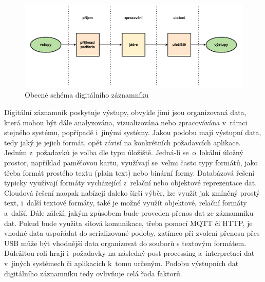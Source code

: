 \begin{figure}[h]
    \centering
    \includegraphics[width=1.00\textwidth]{obrazky-figures/common_digital_datalogger_scheme.pdf}
    \caption{Obecné schéma digitálního záznamníku}
    \label{fig:common-digital-datalogger}
\end{figure}




Digitální záznamník poskytuje výstupy, obvykle jimi jsou organizovaná data, která mohou být dále analyzována, vizualizována nebo zpracovávána v~rámci stejného systému, popřípadě i~jinými systémy. Jakou podobu mají výstupní data, tedy jaký je jejich formát, opět závisí na konkrétních požadavcích aplikace. Jedním z~požadavků je volba dle typu úložiště. Jedná-li se~o~lokální úložný prostor, například paměťovou kartu, využívají se~velmi často typy formátů, jako třeba formát prostého textu (plain text) nebo binární formy. Databázová řešení typicky využívají formáty vycházející z~relační nebo objektové reprezentace dat. Cloudová řešení naopak nabízejí daleko širší výběr, lze využít jak zmíněný prostý text, i~další textové formáty, také je možné využít objektové, relační formáty a~další. Dále záleží, jakým způsobem bude proveden přenos dat ze záznamníku dat. Pokud bude využita síťová komunikace, třeba pomocí MQTT či HTTP, je vhodné data uspořádat do serializované podoby, zatímco při zvolení přenosu přes USB může být vhodnější data organizovat do souborů s textovým formátem. Důležitou roli hrají i~požadavky na následný post-processing a~interpretaci dat v~jiných systémech či aplikacích k~tomu určeným. Podobu výstupních dat digitálního záznamníku tedy ovlivňuje celá řada faktorů.~\cite{usb_standard_mtp, iot_datalogger_with_timestamping, springer_industry_monitoring, researchgate_general_dataloggger_multiple_sdcards, medium_optimalization_iot_data_storage_timescaledb}

